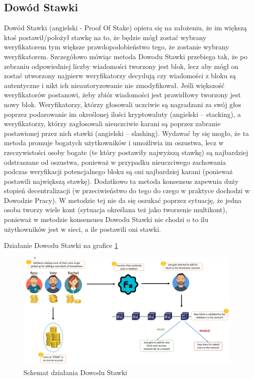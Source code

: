 \subsection{Dowód Stawki}
Dowód Stawki (angielski - Proof Of Stake) opiera się na założeniu, że im większą ktoś postawił/położył stawkę na to, że będzie mógł zostać wybrany weryfikatorem tym większe prawdopodobieństwo tego, że zostanie wybrany weryfikatorem. Szczegółowo mówiąc metoda Dowodu Stawki przebiega tak, że po zebraniu odpowiedniej liczby wiadomości tworzony jest blok, lecz aby mógł on zostać utworzony najpierw weryfikatorzy decydują czy wiadomości z bloku są autentyczne i nikt ich nieautoryzowanie nie zmodyfikował. Jeśli większość weryfikatorów postanowi, żeby zbiór wiadomości jest prawidłowy tworzony jest nowy blok. Weryfikatorzy, którzy głosowali uczciwie są nagradzani za swój głos poprzez podarowanie im określonej ilości kryptowaluty (angielski – stacking), a weryfikatorzy, którzy zagłosowali nieuczciwie karani są poprzez zabranie postawionej przez nich stawki (angielski – slashing). Wydawać by się mogło, że ta metoda promuje bogatych użytkowników i umożliwia im oszustwa, lecz w rzeczywistości osoby bogate (te który postawiły najwyższą stawkę) są najbardziej odstraszane od oszustwa, ponieważ w przypadku nieuczciwego zachowania podczas weryfikacji potencjalnego bloku są oni najbardziej karani (ponieważ postawili największą stawkę). Dodatkowo ta metoda konsensus zapewnia duży stopień decentralizacji (w przeciwieństwo do tego do czego w praktyce dochodzi w Dowodzie Pracy). W metodzie tej nie da się oszukać poprzez sytuację, że jedna osoba tworzy wiele kont (sytuacja określana też jako tworzenie multikont), ponieważ w metodzie konsensusu Dowodu Stawki nie chodzi o to ilu użytkowników jest w sieci, a ile postawili oni stawki.

\vspace{0.3\baselineskip}

Działanie Dowodu Stawki na grafice \ref{fig:ConsensusPOS}
\begin{figure}[H]
    \centering
    \includegraphics[width=\textwidth]{Images/ConsensusPOS.png}
    \caption{Schemat działania Dowodu Stawki}
    \label{fig:ConsensusPOS}
\end{figure}

